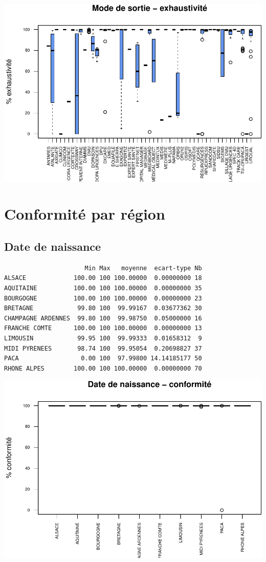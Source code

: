 \documentclass[]{article}
\begin{document}
\includegraphics{septembre2015_files/figure-latex/unnamed-chunk-24-1.pdf}

\section{Conformité par région}\label{conformite-par-region}

\subsection{Date de naissance}\label{date-de-naissance-1}

\begin{verbatim}
                      Min Max   moyenne  ecart-type Nb
ALSACE             100.00 100 100.00000  0.00000000 18
AQUITAINE          100.00 100 100.00000  0.00000000 35
BOURGOGNE          100.00 100 100.00000  0.00000000 23
BRETAGNE            99.80 100  99.99167  0.03677362 30
CHAMPAGNE ARDENNES  99.80 100  99.98750  0.05000000 16
FRANCHE COMTE      100.00 100 100.00000  0.00000000 13
LIMOUSIN            99.95 100  99.99333  0.01658312  9
MIDI PYRENEES       98.74 100  99.95054  0.20698827 37
PACA                 0.00 100  97.99800 14.14185177 50
RHONE ALPES        100.00 100 100.00000  0.00000000 70
\end{verbatim}

\includegraphics{septembre2015_files/figure-latex/unnamed-chunk-25-1.pdf}
\end{document}
